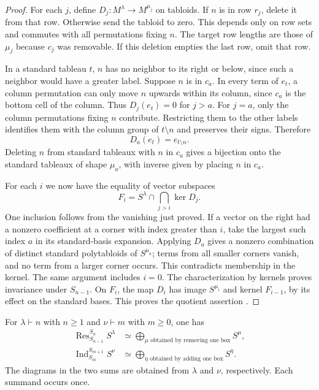 \begin{proof}
For each \(j\), define \(D_j:M^\lambda\to M^{\mu_j}\) on tabloids.
If \(n\) is in row \(r_j\), delete it from that row. Otherwise send
the tabloid to zero. This depends only on row sets and commutes with
all permutations fixing \(n\). The target row lengths are those of
\(\mu_j\) because \(c_j\) was removable. If this deletion empties the
last row, omit that row.

In a standard tableau \(t\), \(n\) has no neighbor to its right or
below, since such a neighbor would have a greater label. Suppose \(n\)
is in \(c_a\). In every term of \(e_t\), a column permutation can only
move \(n\) upwards within its column, since \(c_a\) is the bottom cell
of the column. Thus \(D_j(e_t)=0\) for \(j>a\). For \(j=a\), only
the column permutations fixing \(n\) contribute. Restricting them
to the other labels identifies them with the column group of
\(t\setminus n\) and preserves their signs. Therefore
\[
  D_a(e_t)=e_{t\setminus n}.
\]
Deleting \(n\) from standard tableaux with \(n\) in \(c_a\) gives
a bijection onto the standard tableaux of shape \(\mu_a\), with
inverse given by placing \(n\) in \(c_a\).

For each \(i\) we now have the equality of vector subspaces
\[
  F_i=S^\lambda\cap\bigcap_{j>i}\ker D_j .
\]
One inclusion follows from the vanishing just proved. If a vector on
the right had a nonzero coefficient at a corner with index greater
than \(i\), take the largest such index \(a\) in its standard-basis
expansion. Applying \(D_a\) gives a nonzero combination of distinct
standard polytabloids of \(S^{\mu_a}\); terms from all smaller corners
vanish, and no term from a larger corner occurs. This contradicts
membership in the kernel. The same argument includes \(i=0\).
The characterization by kernels proves invariance under \(S_{n-1}\).
On \(F_i\), the map \(D_i\) has image \(S^{\mu_i}\) and kernel
\(F_{i-1}\), by its effect on the standard bases. This proves the
quotient assertion \cite[Section 2.8]{sagan}.
\end{proof}

\begin{theorem}\label{res:B05}
For \(\lambda\vdash n\) with \(n\ge 1\) and \(\nu\vdash m\)
with \(m\ge 0\), one has
\[
  \begin{aligned}
  \operatorname{Res}^{S_n}_{S_{n-1}} S^\lambda
    &\simeq \bigoplus_{\mu\text{ obtained by removing one box}} S^\mu,\\
  \operatorname{Ind}^{S_{m+1}}_{S_m} S^\nu
    &\simeq \bigoplus_{\eta\text{ obtained by adding one box}} S^\eta .
  \end{aligned}
\]
The diagrams in the two sums are obtained from \(\lambda\) and
\(\nu\), respectively. Each summand occurs once.
\end{theorem}


